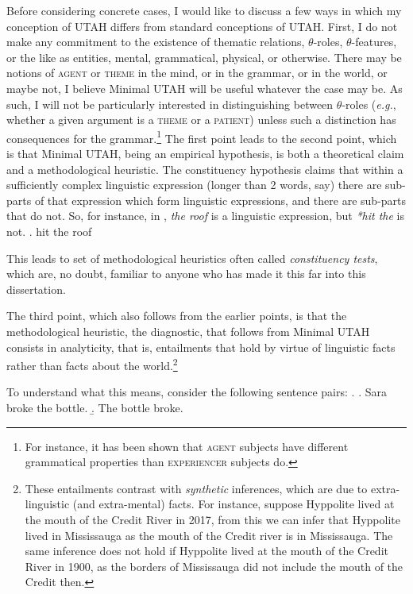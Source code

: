 \documentclass[MilwayThesis]{subfiles}
\begin{document}
Before considering concrete cases, I would like to discuss a few ways in which my conception of UTAH differs from standard conceptions of UTAH.
First, I do not make any commitment to the existence of thematic relations, $\theta$-roles, $\theta$-features, or the like as entities, mental, grammatical, physical, or otherwise.
There may be notions of \textsc{agent} or \textsc{theme} in the mind, or in the grammar, or in the world, or maybe not, I believe Minimal UTAH will be useful whatever the case may be.
As such, I will not be particularly interested in distinguishing between $\theta$-roles (\textit{e.g.}, whether a given argument is a \textsc{theme} or a \textsc{patient}) unless such a distinction has consequences for the grammar.\footnote{
	For instance, it has been shown that \textsc{agent} subjects have different grammatical properties than \textsc{experiencer} subjects do.
}
The first point leads to the second point, which is that Minimal UTAH, being an empirical hypothesis, is both a theoretical claim and a methodological heuristic.
The constituency hypothesis claims that within a sufficiently complex linguistic expression (longer than 2 words, say) there are sub-parts of that expression which form linguistic expressions, and there are sub-parts that do not.
So, for instance, in \Next, \textit{the roof} is a linguistic expression, but \textit{*hit the} is not.
\ex. hit the roof

This leads to set of methodological heuristics often called \textit{constituency tests}, which are, no doubt, familiar to anyone who has made it this far into this dissertation.

The third point, which also follows from the earlier points, is that the methodological heuristic, the diagnostic, that follows from Minimal UTAH consists in analyticity, that is, entailments that hold by virtue of linguistic facts rather than facts about the world.\footnote{
These entailments contrast with \textit{synthetic} inferences, which are due to extra-linguistic (and extra-mental) facts.
For instance, suppose Hyppolite lived at the mouth of the Credit River in 2017, from this we can infer that Hyppolite lived in Mississauga as the mouth of the Credit river is in Mississauga.
The same inference does not hold if Hyppolite lived at the mouth of the Credit River in 1900, as the borders of Mississauga did not include the mouth of the Credit then.}

To understand what this means, consider the following sentence pairs:
\ex. \label{ex:broke-bottle}
\a. Sara broke the bottle.
\b. The bottle broke.
\end{document}
